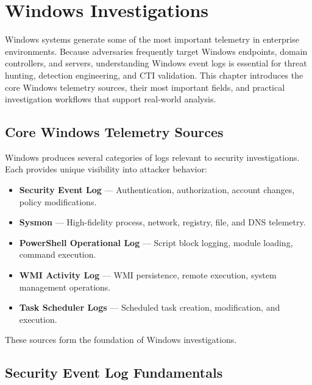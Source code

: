 \section{Windows Investigations}

Windows systems generate some of the most important telemetry in enterprise environments. 
Because adversaries frequently target Windows endpoints, domain controllers, and servers, 
understanding Windows event logs is essential for threat hunting, detection engineering, 
and CTI validation. This chapter introduces the core Windows telemetry sources, their most 
important fields, and practical investigation workflows that support real-world analysis.


\subsection*{Core Windows Telemetry Sources}

Windows produces several categories of logs relevant to security investigations. 
Each provides unique visibility into attacker behavior:

\begin{itemize}
    \item \textbf{Security Event Log} — Authentication, authorization, account changes, policy modifications.
    \item \textbf{Sysmon} — High-fidelity process, network, registry, file, and DNS telemetry.
    \item \textbf{PowerShell Operational Log} — Script block logging, module loading, command execution.
    \item \textbf{WMI Activity Log} — WMI persistence, remote execution, system management operations.
    \item \textbf{Task Scheduler Logs} — Scheduled task creation, modification, and execution.
\end{itemize}

These sources form the foundation of Windows investigations.


\subsection*{Security Event Log Fundamentals}

